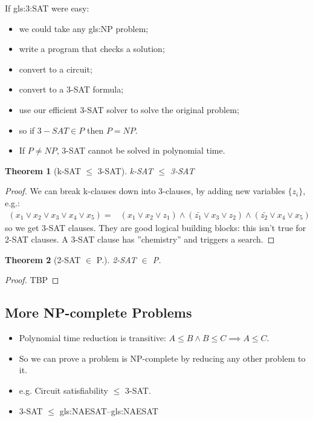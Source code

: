 \documentclass[]{article}
\newtheorem{thm}{Theorem}
\begin{document}
If \gls{gls:3:SAT} were easy:
\begin{itemize}
	\item we could take any \gls{gls:NP} problem;
	\item write a program that checks a solution;
	\item convert to a circuit;
	\item convert to a 3-SAT formula;
	\item use our efficient 3-SAT solver to solve the original problem;
	\item so if $3-SAT \in P$ then $P=NP$.
	\item If $P\ne NP$, 3-SAT cannot be solved in polynomial time.
\end{itemize}

\begin{thm}[k-SAT $\le$ 3-SAT]
	k-SAT $\le$ 3-SAT
\end{thm}

\begin{proof}
	We can break k-clauses down into 3-clauses, by adding new variables $\{z_i\}$, e.g.:
	\begin{align*}
		(x_1 \lor x_2 \lor x_3 \lor x_4 \lor x_5) =& (x_1 \lor x_2 \lor z_1) \land (\bar{z_1} \lor x_3 \lor z_2) \land (\bar{z_2} \lor x_4 \lor x_5)
	\end{align*}
	so we get 3-SAT clauses. They are good logical building blocks: this isn't true for 2-SAT clauses. A 3-SAT clause has ''chemistry'' and triggers a search. 
\end{proof}

\begin{thm}[2-SAT $\in$ P.]
	2-SAT $\in$ P.
\end{thm}

\begin{proof}
	TBP
\end{proof}

\subsection{More NP-complete Problems}

\begin{itemize}
	\item Polynomial time reduction is transitive: $A \le B \land B \le C\implies A \le C$.
	\item So we can prove a problem is NP-complete by reducing any other problem to it.
	\item e.g. Circuit satisfiability $\le$ 3-SAT.
	\item 3-SAT $\le$ \gls{gls:NAESAT}--\glsdesc{gls:NAESAT}
\end{itemize}
\end{document}
